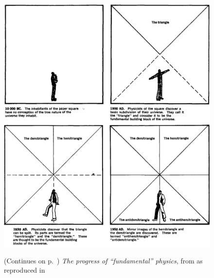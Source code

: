 \documentclass[a4paper,12pt,%
onecolumn,oneside,%
british%
]{memoir}
\renewcommand*{\|}[1][]{\nonscript\:#1\vert\nonscript\:\mathopen{}}
\begin{document}
\begin{figure}[p]
  \centering
  \includegraphics[width=1.2\textwidth]{images/chew1.png}
  \\[1em]  \includegraphics[width=1.2\textwidth]{images/chew2.png}
  \caption{(Continues on p.~\pageref{fig:chew2}) \emph{The progress of \enquote{fundamental} physics}, from \cites{chew1970} as reproduced in \cites{truesdell1984_r1987}}
  \label{fig:chew1}
\end{figure}
\end{document}
